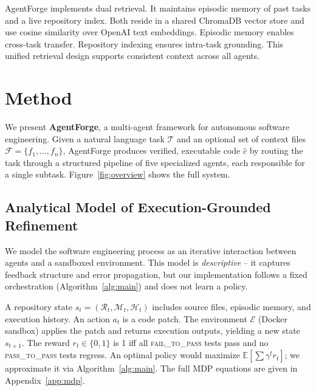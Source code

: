 \documentclass[journal]{IEEEtran}
\begin{document}
AgentForge implements dual retrieval. It maintains episodic memory of past tasks and a live repository index. Both reside in a shared ChromaDB vector store and use cosine similarity over OpenAI text embeddings. Episodic memory enables cross-task transfer. Repository indexing ensures intra-task grounding. This unified retrieval design supports consistent context across all agents.


\section{Method}
\label{sec:method}

We present \textbf{AgentForge}, a multi-agent framework for autonomous software engineering. Given a natural language task $\mathcal{T}$ and an optional set of context files $\mathcal{F} = \{f_1, \dots, f_n\}$, AgentForge produces verified, executable code $\hat{c}$ by routing the task through a structured pipeline of five specialized agents, each responsible for a single subtask. Figure~\ref{fig:overview} shows the full system.




\subsection{Analytical Model of Execution-Grounded Refinement}
\label{sec:formal}

We model the software engineering process as an iterative interaction between agents and a sandboxed environment. This model is \emph{descriptive} -- it captures feedback structure and error propagation, but our implementation follows a fixed orchestration (Algorithm~\ref{alg:main}) and does not learn a policy.

A repository state $s_t = (\mathcal{R}_t, \mathcal{M}_t, \mathcal{H}_t)$ includes source files, episodic memory, and execution history. An action $a_t$ is a code patch. The environment $\mathcal{E}$ (Docker sandbox) applies the patch and returns execution outputs, yielding a new state $s_{t+1}$. The reward $r_t \in \{0,1\}$ is 1 iff all \textsc{fail\_to\_pass} tests pass and no \textsc{pass\_to\_pass} tests regress. An optimal policy would maximize $\mathbb{E}[\sum \gamma^t r_t]$; we approximate it via Algorithm~\ref{alg:main}. The full MDP equations are given in Appendix~\ref{app:mdp}.
\end{document}
